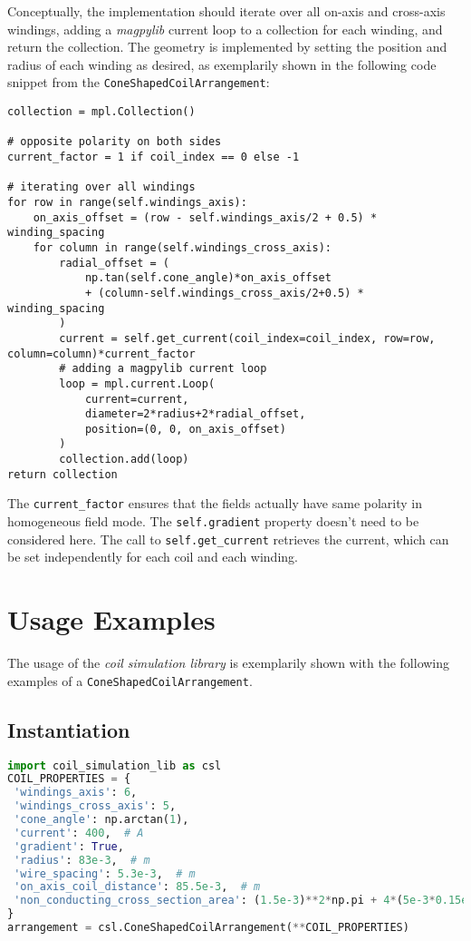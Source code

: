 Conceptually, the implementation should iterate over all on-axis and cross-axis windings, adding a \textit{magpylib} current loop to a collection for each winding, and return the collection. The geometry is implemented by setting the position and radius of each winding as desired, as exemplarily shown in the following code snippet from the \texttt{ConeShapedCoilArrangement}:
\begin{lstlisting}
collection = mpl.Collection()

# opposite polarity on both sides
current_factor = 1 if coil_index == 0 else -1

# iterating over all windings
for row in range(self.windings_axis):
    on_axis_offset = (row - self.windings_axis/2 + 0.5) * winding_spacing
    for column in range(self.windings_cross_axis):
        radial_offset = (
            np.tan(self.cone_angle)*on_axis_offset
            + (column-self.windings_cross_axis/2+0.5) * winding_spacing
        )
        current = self.get_current(coil_index=coil_index, row=row, column=column)*current_factor
        # adding a magpylib current loop
        loop = mpl.current.Loop(
            current=current,
            diameter=2*radius+2*radial_offset,
            position=(0, 0, on_axis_offset)
        )
        collection.add(loop)
return collection
\end{lstlisting}
The \texttt{current\_factor} ensures that the fields actually have same polarity in homogeneous field mode. The \texttt{self.gradient} property doesn't need to be considered here. The call to \texttt{self.get\_current} retrieves the current, which can be set independently for each coil and each winding.

\section*{Usage Examples}
The usage of the \textit{coil simulation library} is exemplarily shown with the following examples of a \texttt{ConeShapedCoilArrangement}.

\subsection*{Instantiation}
\begin{lstlisting}[language=Python]
import coil_simulation_lib as csl
COIL_PROPERTIES = {
 'windings_axis': 6,
 'windings_cross_axis': 5,
 'cone_angle': np.arctan(1),
 'current': 400,  # A
 'gradient': True,
 'radius': 83e-3,  # m
 'wire_spacing': 5.3e-3,  # m
 'on_axis_coil_distance': 85.5e-3,  # m
 'non_conducting_cross_section_area': (1.5e-3)**2*np.pi + 4*(5e-3*0.15e-3)  # m^2
}
arrangement = csl.ConeShapedCoilArrangement(**COIL_PROPERTIES)
\end{lstlisting}

